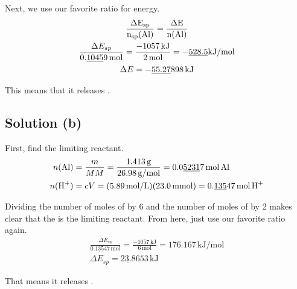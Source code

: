 \documentclass[10pt]{article}
\newcommand{\U}[1]{\underline{#1}}
\begin{document}
            Next, we use our favorite ratio for energy.
            \begin{gather}
                \rm
                \frac{\Delta E_{sp}}{n_{sp}(Al)}    =   \frac{\Delta E}{n(Al)}\\
                \frac{\Delta E_{sp}}{0.\U{1045}9\,\unit{\mole}} =   \frac{-1057\,\unit{\kilo\joule}}{2\,\unit{\mole}}
                    =   -\U{528.5}\unit{\kilo\joule/\mole}\\
                \Delta E    =   -\U{55.27}898\,\unit{\kilo\joule}
            \end{gather}

            This means that it releases . 

        \subsection{Solution (b)}
            First, find the limiting reactant.
            \begin{align}
                n(\ce{Al})  &=  \frac{m}{MM}
                    =   \frac{1.413\,\unit{\gram}}{26.98\,\unit{\gram/\mole}}
                    =   0.0\U{5231}7\,\unit{\mole}\,\ce{Al}\\
                n(\ce{H+})  &=  cV
                    =   (5.89\,\unit{\mole/\liter}) (23.0\,\unit{\milli\mole})
                    =   0.\U{135}47\,\unit{\mole}\,\ce{H+}
            \end{align}

            Dividing the number of moles of  by 6 and the number of moles of  by 2 makes clear that the  is the limiting reactant.
            From here, just use our favorite ratio again.
            \begin{gather}
                \frac{\Delta E_{sp}}{0.\U{135}47\,\unit{\mole}}    =   \frac{-1057\,\unit{\kilo\joule}}{6\,\unit{\mole}}
                    =   176.167\,\unit{\kilo\joule/\mole}\\
                \Delta E_{sp}   =   \U{23.8}653\,\unit{\kilo\joule}
            \end{gather}

            That means it releases . 
        
\end{document}
